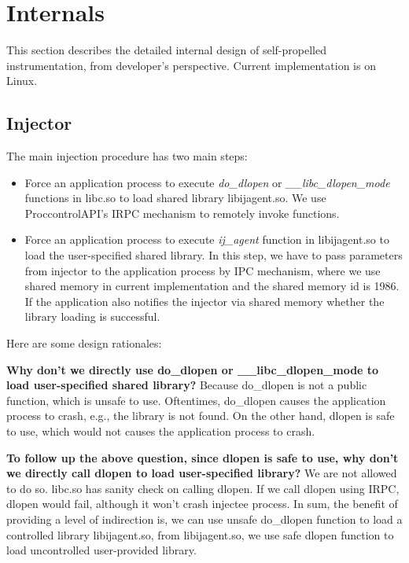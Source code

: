 \section{Internals}

This section describes the detailed internal design of self-propelled
instrumentation, from developer's perspective.
Current implementation is on Linux.

\subsection{Injector}

The main injection procedure has two main steps:
\begin{itemize}
\item Force an application process to execute {\em do\_dlopen} or {\em
    \_\_libc\_dlopen\_mode} functions in libc.so to load shared library
  libijagent.so. We use ProccontrolAPI's IRPC mechanism to remotely invoke
  functions.
\item Force an application process to execute {\em ij\_agent} function in
  libijagent.so to load the user-specified shared library. In this step, we have
  to pass parameters from injector to the application process by IPC mechanism,
  where we use shared memory in current implementation and the shared memory id
  is 1986. If the application also notifies the injector via shared memory
  whether the library loading is successful.
\end{itemize}

Here are some design rationales:

\textbf{Why don't we directly use do\_dlopen or \_\_libc\_dlopen\_mode to load
  user-specified shared library?}  Because do\_dlopen is not a public function,
which is unsafe to use.  Oftentimes, do\_dlopen causes the application process
to crash, e.g., the library is not found. On the other hand, dlopen is safe to
use, which would not causes the application process to crash.

\textbf{To follow up the above question, since dlopen is safe to use, why don't
  we directly call dlopen to load user-specified library?}  We are not allowed
to do so. libc.so has sanity check on calling dlopen. If we call dlopen using
IRPC, dlopen would fail, although it won't crash injectee process. In sum, the
benefit of providing a level of indirection is, we can use unsafe do\_dlopen
function to load a controlled library libijagent.so, from libijagent.so, we use
safe dlopen function to load uncontrolled user-provided library.


